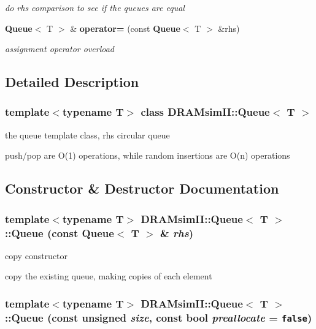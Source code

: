 \begin{CompactItemize}
\begin{CompactList}\small\item\em do rhs comparison to see if the queues are equal \item\end{CompactList}\item 
{\bf Queue}$<$ T $>$ \& {\bf operator=} (const {\bf Queue}$<$ T $>$ \&rhs)
\begin{CompactList}\small\item\em assignment operator overload \item\end{CompactList}\end{CompactItemize}


\subsection{Detailed Description}
\subsubsection*{template$<$typename T$>$ class DRAMsimII::Queue$<$ T $>$}

the queue template class, rhs circular queue 

push/pop are O(1) operations, while random insertions are O(n) operations 

\subsection{Constructor \& Destructor Documentation}
\subsubsection[{Queue}]{\setlength{\rightskip}{0pt plus 5cm}template$<$typename T$>$ {\bf DRAMsimII::Queue}$<$ T $>$::{\bf Queue} (const {\bf Queue}$<$ T $>$ \& {\em rhs})\hspace{0.3cm}{\tt  [inline, explicit]}}\label{class_d_r_a_msim_i_i_1_1_queue_a43f7ac274a3432a36b8f275ce27d67c}


copy constructor 

copy the existing queue, making copies of each element 
\subsubsection[{Queue}]{\setlength{\rightskip}{0pt plus 5cm}template$<$typename T$>$ {\bf DRAMsimII::Queue}$<$ T $>$::{\bf Queue} (const unsigned {\em size}, \/  const bool {\em preallocate} = {\tt false})\hspace{0.3cm}{\tt  [inline, explicit]}}\label{class_d_r_a_msim_i_i_1_1_queue_166d590604d089637db1304f11167b5a}


